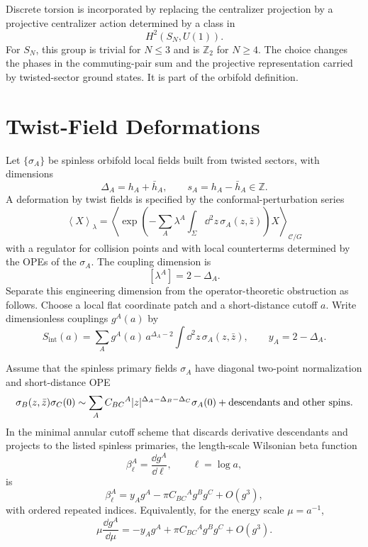 Discrete torsion is incorporated by replacing the centralizer projection by a
projective centralizer action determined by a class in
\[
  H^2(S_N,U(1)).
\]
For \(S_N\), this group is trivial for \(N\le3\) and is \(\mathbb Z_2\) for
\(N\ge4\).  The choice changes the phases in the commuting-pair sum and the
projective representation carried by twisted-sector ground states.  It is
part of the orbifold definition.

\section{Twist-Field Deformations}

Let \(\{\sigma_A\}\) be spinless orbifold local fields built from twisted
sectors, with dimensions
\[
  \Delta_A=h_A+\bar h_A,\qquad s_A=h_A-\bar h_A\in\mathbb Z .
\]
A deformation by twist fields is specified by the conformal-perturbation
series
\begin{equation}
  \left\langle X\right\rangle_\lambda
  =
  \left\langle
    \exp\left(
      -\sum_A\lambda^A\int_\Sigma\dd^2z\,\sigma_A(z,\bar z)
    \right)X
  \right\rangle_{\mathcal C/G}
  \label{eq:twist-field-deformation-series}
\end{equation}
with a regulator for collision points and with local counterterms determined
by the OPEs of the \(\sigma_A\).  The coupling dimension is
\[
  [\lambda^A]=2-\Delta_A .
\]
Separate this engineering dimension from the operator-theoretic obstruction as
follows.  Choose a local flat coordinate patch and a short-distance cutoff
\(a\).  Write dimensionless couplings \(g^A(a)\) by
\[
  S_{\mathrm{int}}(a)
  =
  \sum_A g^A(a)\,a^{\Delta_A-2}
  \int \dd^2z\,\sigma_A(z,\bar z),
  \qquad
  y_A=2-\Delta_A .
\]

\begin{proposition}
\label{prop:twist-field-cutoff-ope-beta}
Assume that the spinless primary fields \(\sigma_A\) have diagonal two-point
normalization and short-distance OPE
\begin{equation}
  \sigma_B(z,\bar z)\sigma_C(0)
  \sim
  \sum_A C_{BC}{}^A
  |z|^{\Delta_A-\Delta_B-\Delta_C}\sigma_A(0)
  +\hbox{descendants and other spins}.
  \label{eq:twist-field-ope-coefficients}
\end{equation}
In the minimal annular cutoff scheme that discards derivative descendants and
projects to the listed spinless primaries, the length-scale Wilsonian beta
function
\[
  \beta_\ell^A=\frac{\dd g^A}{\dd \ell},
  \qquad \ell=\log a ,
\]
is
\begin{equation}
  \beta_\ell^A
  =
  y_A g^A
  -
  \pi C_{BC}{}^A g^B g^C
  +O(g^3),
  \label{eq:twist-field-length-beta}
\end{equation}
with ordered repeated indices.  Equivalently, for the energy scale
\(\mu=a^{-1}\),
\begin{equation}
  \mu\frac{\dd g^A}{\dd\mu}
  =
  -y_A g^A
  +
  \pi C_{BC}{}^A g^B g^C
  +O(g^3).
  \label{eq:twist-field-energy-beta}
\end{equation}
\end{proposition}

